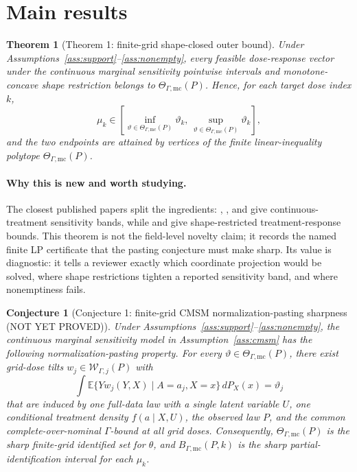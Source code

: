 \documentclass[11pt]{article}
\newcommand{\E}{\mathbb{E}}
\theoremstyle{definition}
\theoremstyle{plain}
\newtheorem{theorem}{Theorem}
\newtheorem{conjecture}{Conjecture}
\theoremstyle{remark}
\begin{document}
\section{Main results}
\begin{theorem}[Theorem 1: finite-grid shape-closed outer bound]\label{thm:finite-polytope}
Under Assumptions~\ref{ass:support}--\ref{ass:nonempty}, every feasible dose-response vector under the continuous marginal sensitivity pointwise intervals and monotone-concave shape restriction belongs to \(\Theta_{\Gamma,\mathrm{mc}}(P)\).  Hence, for each target dose index \(k\),
\[
\mu_k\in
\left[
\inf_{\vartheta\in\Theta_{\Gamma,\mathrm{mc}}(P)}\vartheta_k,\,
\sup_{\vartheta\in\Theta_{\Gamma,\mathrm{mc}}(P)}\vartheta_k
\right],
\]
and the two endpoints are attained by vertices of the finite linear-inequality polytope \(\Theta_{\Gamma,\mathrm{mc}}(P)\).
\end{theorem}

\paragraph{Why this is new and worth studying.}
The closest published papers split the ingredients: \citet{MarmarelisHaddadJessonJahanshadGalstyanVerSteeg2023}, \citet{JessonDouglasManshausenSolalMeinshausenStierGalShalit2022}, and \citet{DalalTchetgenTchetgen2025} give continuous-treatment sensitivity bands, while \citet{Manski1997} and \citet{OkumuraUsui2014} give shape-restricted treatment-response bounds.  This theorem is not the field-level novelty claim; it records the named finite LP certificate that the pasting conjecture must make sharp.  Its value is diagnostic: it tells a reviewer exactly which coordinate projection would be solved, where shape restrictions tighten a reported sensitivity band, and where nonemptiness fails.

\begin{conjecture}[Conjecture 1: finite-grid CMSM normalization-pasting sharpness (NOT YET PROVED)]\label{conj:joint-sharpness}
Under Assumptions~\ref{ass:support}--\ref{ass:nonempty}, the continuous marginal sensitivity model in Assumption~\ref{ass:cmsm} has the following normalization-pasting property.  For every \(\vartheta\in\Theta_{\Gamma,\mathrm{mc}}(P)\), there exist grid-dose tilts \(w_j\in\mathcal W_{\Gamma,j}(P)\) with
\[
\int \E\{Yw_j(Y,X)\mid A=a_j,X=x\}\,dP_X(x)=\vartheta_j
\]
that are induced by one full-data law with a single latent variable \(U\), one conditional treatment density \(f(a\mid X,U)\), the observed law \(P\), and the common complete-over-nominal \(\Gamma\)-bound at all grid doses.  Consequently, \(\Theta_{\Gamma,\mathrm{mc}}(P)\) is the sharp finite-grid identified set for \(\theta\), and \(B_{\Gamma,\mathrm{mc}}(P,k)\) is the sharp partial-identification interval for each \(\mu_k\).
\end{conjecture}
\end{document}
